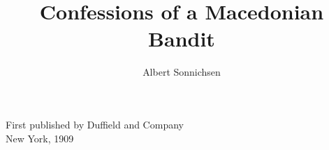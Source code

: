 \documentclass[a5paper,12pt]{book}
\begin{document}
\frontmatter
\title{Confessions of a Macedonian Bandit}
\author{Albert Sonnichsen}
\date{}

\maketitle

\newpage

\newpage
\begin{center}
    \vspace*{\fill}
    First published by Duffield and Company\\
    New York, 1909\\
    \vspace*{\fill}
\end{center}


\tableofcontents

\mainmatter





%
\end{document}
